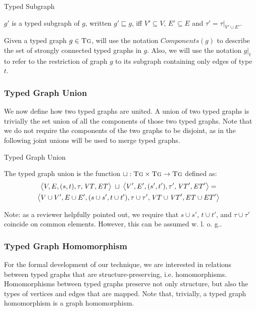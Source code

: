 \begin{definition}{Typed Subgraph\\}
\label{def:typedsubgraph}

$g'$ is a typed subgraph of $g$, written $g'\sqsubseteq g$, iff $V'\subseteq V$, $E'\subseteq E$ and $\tau'=\tau |_{V'\cup E'}$.

\end{definition}

Given a typed graph $g\in \textsc{Tg}$, will use the notation $Components(g)$ to describe the set of strongly connected typed graphs in $g$. Also, we will use the notation $g|_{t}$ to refer to the restriction of graph $g$ to its subgraph containing only edges of type $t$.


\subsubsection*{Typed Graph Union}
We now define how two typed graphs are united. A union of two typed graphs is trivially the set union of all the components of those two typed graphs. Note that we do not require the components of the two graphs to be disjoint, as in the following joint unions will be used to merge typed graphs.

\begin{definition}{Typed Graph Union\\}
\label{def:typed_graph_union}


The typed graph union is the function $\sqcup :\textsc{Tg}\times \textsc{Tg}\rightarrow \textsc{Tg}$ defined as:
\begin{multline*}
\big\langle V,E,(s,t),\tau,\mathit{VT},\mathit{ET}\big\rangle\;\sqcup\;\big\langle V',E',(s',t'),\tau',\mathit{VT}',\mathit{ET}'\big\rangle=\\\big\langle V\cup V', E\cup
E',(s\cup s', t\cup t'), \tau\cup \tau', \mathit{VT}\cup \mathit{VT}', \mathit{ET}\cup ET'\big\rangle
\end{multline*}
\end{definition}

Note: as a reviewer helpfully pointed out, we require that $s \cup s'$, $t \cup t'$, and $\tau \cup \tau'$ coincide on common elements. However, this can be assumed w. l. o. g..

\subsubsection*{Typed Graph Homomorphism}
For the formal development of our technique, we are interested in relations between typed graphs that are structure-preserving, i.e. homomorphisms. Homomorphisms between typed graphs preserve not only structure, but also the types of vertices and edges that are mapped. Note that, trivially, a typed graph homomorphism is a graph homomorphism.

